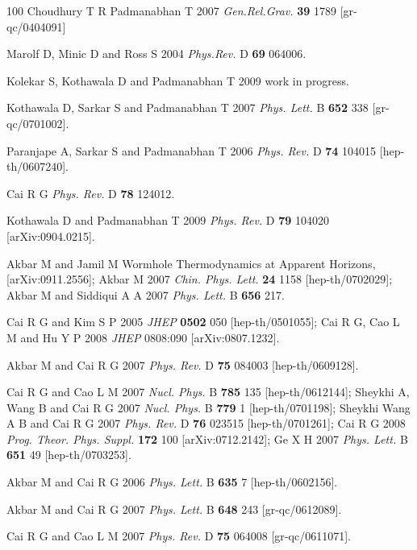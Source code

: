 \documentclass[12pt]{iopart}
\begin{document}
\begin{thebibliography}{100}
Choudhury  T R  Padmanabhan T  2007 \textit{Gen.Rel.Grav.} \textbf{39} 1789 [gr-qc/0404091]  

Marolf D,  Minic D and  Ross S 2004 \textit{ Phys.Rev.} D \textbf{69}  064006.
 
Kolekar S,  Kothawala D and  Padmanabhan T  2009 work in progress. 



Kothawala D, Sarkar  S and Padmanabhan T 2007
  \textit{Phys. Lett.}  B {\bf 652} 338   [gr-qc/0701002].

Paranjape A, Sarkar S and Padmanabhan T 2006 \textit{Phys. Rev.} D {\bf 74} 104015 [hep-th/0607240].


Cai R G  \textit{Phys. Rev.}  D {\bf 78} 124012.
  

Kothawala D and Padmanabhan T 2009 \textit{Phys. Rev.} D \textbf{79} 104020 [arXiv:0904.0215]. 


Akbar M and Jamil M Wormhole Thermodynamics at Apparent Horizons, [arXiv:0911.2556]; 
Akbar M 2007 \textit{Chin. Phys. Lett.}  {\bf 24} 1158  [hep-th/0702029];
Akbar M and Siddiqui A A  2007 \textit{Phys. Lett.}  B {\bf 656} 217.




Cai R G and Kim  S P  2005 \textit{JHEP} {\bf 0502} 050  [hep-th/0501055];
Cai R G, Cao L M and Hu Y P 2008 \textit{JHEP} 0808:090 [arXiv:0807.1232].  

Akbar M and Cai  R G  2007 \textit{Phys. Rev.}  D {\bf 75} 084003  [hep-th/0609128].
  
Cai R G and Cao L M 2007  \textit{Nucl. Phys.}  B {\bf 785} 135 [hep-th/0612144];
Sheykhi A,  Wang B and Cai R G  2007 \textit{Nucl. Phys.}  B {\bf 779} 1 [hep-th/0701198];
Sheykhi Wang A B and Cai R G 2007 \textit{Phys. Rev.} D {\bf 76} 023515  [hep-th/0701261];
Cai  R G 2008  \textit{Prog. Theor. Phys. Suppl.} {\bf 172} 100 [arXiv:0712.2142];
Ge  X H  2007 \textit{Phys. Lett.}  B {\bf 651} 49  [hep-th/0703253].


Akbar M and Cai  R G 2006 \textit{Phys. Lett.}  B {\bf 635} 7  [hep-th/0602156].
 

Akbar M and Cai  R G 2007 \textit{Phys. Lett.}  B {\bf 648} 243   [gr-qc/0612089].

  

Cai R G and Cao L M 2007  \textit{Phys. Rev.}  D {\bf 75} 064008  [gr-qc/0611071].



\end{thebibliography}
\end{document}
